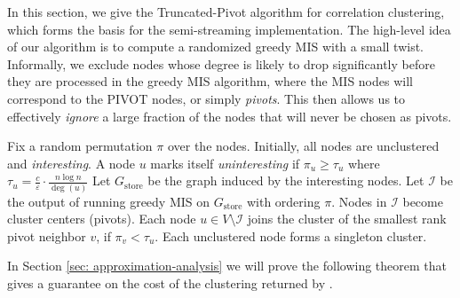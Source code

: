 \documentclass[10pt,a4paper]{article}
\newcommand{\pivot}{\textrm{PIVOT}\xspace}
\newcommand{\truncatedpivot}{\textrm{Truncated-Pivot}\xspace}
\newcommand{\eps}{\ensuremath{\varepsilon}}
\newcommand{\gstore}{\ensuremath{G_\mathrm{store}}\xspace}
\begin{document}
In this section, we give the \truncatedpivot algorithm for correlation clustering, which forms the basis for the semi-streaming implementation. 
The high-level idea of our algorithm is to compute a randomized greedy MIS with a small twist. 
Informally, we exclude nodes whose degree is likely to drop significantly before they are processed in the greedy MIS algorithm, where the MIS nodes will correspond to the \pivot nodes, or simply \emph{pivots}. 
This then allows us to effectively \emph{ignore} a large fraction of the nodes that will never be chosen as pivots.


\begin{algorithm}[tbh]
\caption{\truncatedpivot}\label{alg:delta-pivot}

     Fix a random permutation $\pi$ over the nodes.\;
     Initially, all nodes are unclustered and \emph{interesting}.\;
     A node $u$ marks itself \emph{uninteresting} if $\pi_{u} \geq \tau_{u}$ where $\tau_{u} = \frac{c}{\eps}\cdot \frac{n\log n}{\deg(u)}$ \label{line: interesting}\;
     Let \gstore be the graph induced by the interesting nodes.\label{line: gstore}\;
     Let $\mathcal{I}$ be the output of running greedy MIS on $\gstore$ with ordering $\pi$. \label{line:greedy-mis-prefix}\;
     Nodes in $\mathcal{I}$ become cluster centers (pivots). \label{line:pivot}\;
     Each node $u \in V \setminus \mathcal{I}$ joins the cluster of the smallest rank pivot neighbor $v$, if $\pi_v < \tau_u$.\label{line:cluster-pivot-nbrs}\;
     Each unclustered node forms a singleton cluster.\label{line: singleton}\;

\end{algorithm} 
In Section \ref{sec: approximation-analysis} we will prove the following theorem that gives a guarantee on the cost of the clustering returned by .
\end{document}
